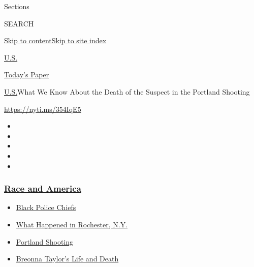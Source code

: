 Sections

SEARCH

\protect\hyperlink{site-content}{Skip to
content}\protect\hyperlink{site-index}{Skip to site index}

\href{https://www.nytimes3xbfgragh.onion/section/us}{U.S.}

\href{https://myaccount.nytimes3xbfgragh.onion/auth/login?response_type=cookie\&client_id=vi}{}

\href{https://www.nytimes3xbfgragh.onion/section/todayspaper}{Today's
Paper}

\href{/section/us}{U.S.}\textbar{}What We Know About the Death of the
Suspect in the Portland Shooting

\url{https://nyti.ms/354IqE5}

\begin{itemize}
\item
\item
\item
\item
\item
\end{itemize}

\hypertarget{race-and-america}{%
\subsubsection{\texorpdfstring{\href{https://www.nytimes3xbfgragh.onion/news-event/george-floyd-protests-minneapolis-new-york-los-angeles?name=styln-george-floyd\&region=TOP_BANNER\&block=storyline_menu_recirc\&action=click\&pgtype=Article\&impression_id=753b05f0-f52c-11ea-9041-ebce11644e1e\&variant=undefined}{Race
and America}}{Race and America}}\label{race-and-america}}

\begin{itemize}
\tightlist
\item
  \href{https://www.nytimes3xbfgragh.onion/2020/09/11/us/black-police-chiefs-reform.html?name=styln-george-floyd\&region=TOP_BANNER\&block=storyline_menu_recirc\&action=click\&pgtype=Article\&impression_id=753b2d00-f52c-11ea-9041-ebce11644e1e\&variant=undefined}{Black
  Police Chiefs}
\item
  \href{https://www.nytimes3xbfgragh.onion/2020/09/04/nyregion/rochester-police-daniel-prude.html?name=styln-george-floyd\&region=TOP_BANNER\&block=storyline_menu_recirc\&action=click\&pgtype=Article\&impression_id=753b2d01-f52c-11ea-9041-ebce11644e1e\&variant=undefined}{What
  Happened in Rochester, N.Y.}
\item
  \href{https://www.nytimes3xbfgragh.onion/2020/08/30/us/portland-shooting-explained.html?name=styln-george-floyd\&region=TOP_BANNER\&block=storyline_menu_recirc\&action=click\&pgtype=Article\&impression_id=753b2d02-f52c-11ea-9041-ebce11644e1e\&variant=undefined}{Portland
  Shooting}
\item
  \href{https://www.nytimes3xbfgragh.onion/2020/08/30/us/breonna-taylor-police-killing.html?name=styln-george-floyd\&region=TOP_BANNER\&block=storyline_menu_recirc\&action=click\&pgtype=Article\&impression_id=753b2d03-f52c-11ea-9041-ebce11644e1e\&variant=undefined}{Breonna
  Taylor's Life and Death}
\end{itemize}

